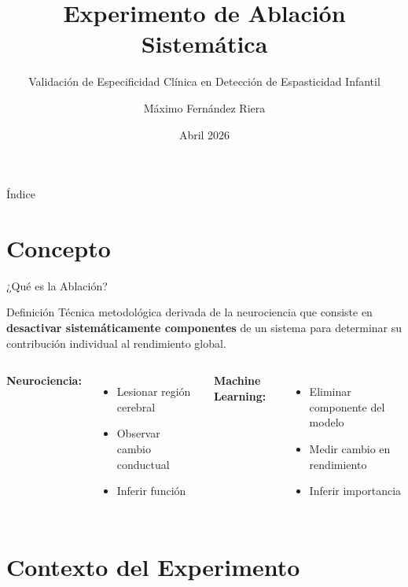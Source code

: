 \documentclass[aspectratio=169]{beamer}
\title{Experimento de Ablación Sistemática}
\subtitle{Validación de Especificidad Clínica en Detección de Espasticidad Infantil}
\author{Máximo Fernández Riera}
\institute{Universitat Oberta de Catalunya (UOC)}
\date{Abril 2026}
\begin{document}
\frame{\titlepage}

\begin{frame}{Índice}
\tableofcontents
\end{frame}

\section{Concepto}

\begin{frame}{¿Qué es la Ablación?}
\begin{block}{Definición}
Técnica metodológica derivada de la neurociencia que consiste en \textbf{desactivar sistemáticamente componentes} de un sistema para determinar su contribución individual al rendimiento global.
\end{block}

\vspace{0.5cm}

\begin{columns}
\textbf{Neurociencia:}
\begin{itemize}
\item Lesionar región cerebral
\item Observar cambio conductual
\item Inferir función
\end{itemize}

\textbf{Machine Learning:}
\begin{itemize}
\item Eliminar componente del modelo
\item Medir cambio en rendimiento
\item Inferir importancia
\end{itemize}
\end{columns}
\end{frame}

\section{Contexto del Experimento}
\end{document}
